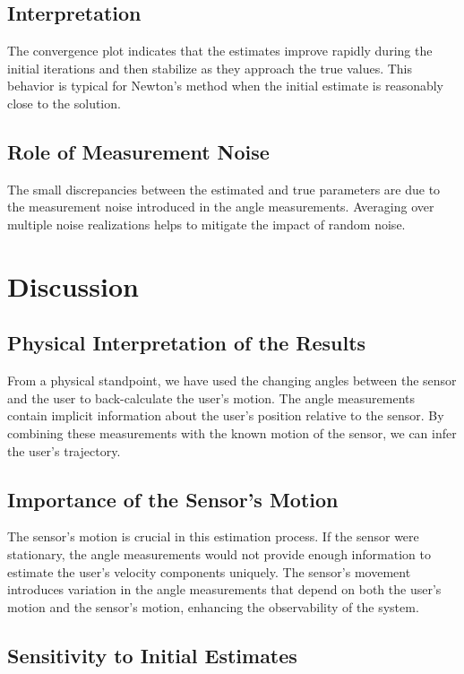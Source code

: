 \documentclass[12pt]{article}
\begin{document}
\subsection{Interpretation}

The convergence plot indicates that the estimates improve rapidly during the initial iterations and then stabilize as they approach the true values. This behavior is typical for Newton's method when the initial estimate is reasonably close to the solution.

\subsection{Role of Measurement Noise}

The small discrepancies between the estimated and true parameters are due to the measurement noise introduced in the angle measurements. Averaging over multiple noise realizations helps to mitigate the impact of random noise.

\section{Discussion}

\subsection{Physical Interpretation of the Results}

From a physical standpoint, we have used the changing angles between the sensor and the user to back-calculate the user's motion. The angle measurements contain implicit information about the user's position relative to the sensor. By combining these measurements with the known motion of the sensor, we can infer the user's trajectory.

\subsection{Importance of the Sensor's Motion}

The sensor's motion is crucial in this estimation process. If the sensor were stationary, the angle measurements would not provide enough information to estimate the user's velocity components uniquely. The sensor's movement introduces variation in the angle measurements that depend on both the user's motion and the sensor's motion, enhancing the observability of the system.

\subsection{Sensitivity to Initial Estimates}
\end{document}
